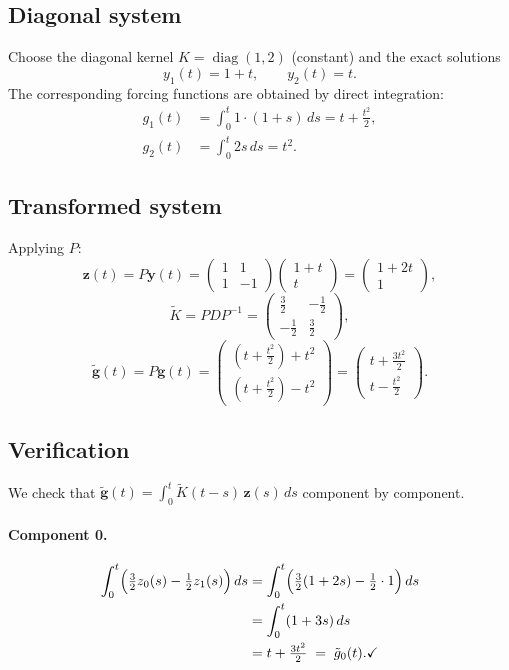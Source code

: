 \documentclass[11pt]{article}
\begin{document}
\subsection*{Diagonal system}

Choose the diagonal kernel $K = \operatorname{diag}(1,2)$ (constant) and the
exact solutions
\[
  y_1(t) = 1+t, \qquad y_2(t) = t.
\]
The corresponding forcing functions are obtained by direct integration:
\begin{align*}
  g_1(t) &= \int_0^t 1\cdot(1+s)\,ds = t + \tfrac{t^2}{2}, \\[4pt]
  g_2(t) &= \int_0^t 2s\,ds = t^2.
\end{align*}

\subsection*{Transformed system}

Applying $P$:
\[
  \mathbf{z}(t) = P\mathbf{y}(t)
  = \begin{pmatrix}1&1\\1&-1\end{pmatrix}\begin{pmatrix}1+t\\t\end{pmatrix}
  = \begin{pmatrix}1+2t\\1\end{pmatrix},
\]
\[
  \widetilde{K} = PDP^{-1}
  = \begin{pmatrix}\tfrac{3}{2}&-\tfrac{1}{2}\\-\tfrac{1}{2}&\tfrac{3}{2}\end{pmatrix},
\]
\[
  \widetilde{\mathbf{g}}(t) = P\mathbf{g}(t)
  = \begin{pmatrix}(t+\tfrac{t^2}{2})+t^2\\(t+\tfrac{t^2}{2})-t^2\end{pmatrix}
  = \begin{pmatrix}t+\tfrac{3t^2}{2}\\t-\tfrac{t^2}{2}\end{pmatrix}.
\]

\subsection*{Verification}

We check that $\widetilde{\mathbf{g}}(t) = \int_0^t\widetilde{K}(t-s)\,\mathbf{z}(s)\,ds$
component by component.

\paragraph{Component 0.}
\begin{align*}
  \int_0^t \Bigl(\tfrac{3}{2}z_0(s) - \tfrac{1}{2}z_1(s)\Bigr)\,ds
  &= \int_0^t \Bigl(\tfrac{3}{2}(1+2s) - \tfrac{1}{2}\cdot 1\Bigr)\,ds \\
  &= \int_0^t (1+3s)\,ds \\
  &= t + \tfrac{3t^2}{2} \;=\; \tilde{g}_0(t). \checkmark
\end{align*}
\end{document}
